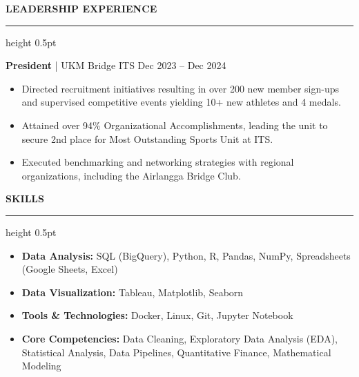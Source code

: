 \documentclass[11pt, letterpaper]{article}
\newcommand{\cvsection}[1]{%
    \vspace{0.8em}%
    {\large \textbf{\MakeUppercase{#1}}}%
    \vspace{0.2em}%
    \hrule height 0.5pt%
    \vspace{0.4em}%
}
\begin{document}
\cvsection{Leadership Experience}
\textbf{President} | UKM Bridge ITS \hfill Dec 2023 -- Dec 2024
\begin{itemize}[leftmargin=*, nosep]
    \item Directed recruitment initiatives resulting in over 200 new member sign-ups and supervised competitive events yielding 10+ new athletes and 4 medals.
    \item Attained over 94\% Organizational Accomplishments, leading the unit to secure 2nd place for Most Outstanding Sports Unit at ITS.
    \item Executed benchmarking and networking strategies with regional organizations, including the Airlangga Bridge Club.
\end{itemize}

\cvsection{Skills}
\begin{itemize}[leftmargin=*, nosep]
    \item \textbf{Data Analysis:} SQL (BigQuery), Python, R, Pandas, NumPy, Spreadsheets (Google Sheets, Excel)
    \item \textbf{Data Visualization:} Tableau, Matplotlib, Seaborn
    \item \textbf{Tools \& Technologies:} Docker, Linux, Git, Jupyter Notebook
    \item \textbf{Core Competencies:} Data Cleaning, Exploratory Data Analysis (EDA), Statistical Analysis, Data Pipelines, Quantitative Finance, Mathematical Modeling
\end{itemize}
\end{document}
